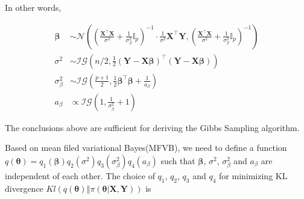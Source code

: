 \documentclass[12pt]{article}
\begin{document}
In other words,

\begin{align*}
	\bm{\beta} &\sim \mathcal{N}\left(\left(\frac{\bm{X}^\top \bm{X}}{\sigma^2} + \frac{1}{\sigma_{\beta}^2} \mathbb{I}_{p} \right)^{-1} \cdot \frac{1}{\sigma^2}\bm{X}^\top \bm{Y},  \left(\frac{\bm{X}^\top \bm{X}}{\sigma^2} + \frac{1}{\sigma_{\beta}^2} \mathbb{I}_{p} \right)^{-1} \right)\\
	\sigma^2 & \sim \mathcal{IG}\left(n/2, \frac{1}{2} (\bm{Y} - \bm{X}\bm{\beta})^\top (\bm{Y} - \bm{X}\bm{\beta}) \right) \\
	\sigma_{\beta}^2 & \sim \mathcal{IG}\left( \frac{p+1}{2}, \frac{1}{2}\bm{\beta}^\top \bm{\beta} + \frac{1}{a_\beta} \right)\\
	a_\beta &\propto \mathcal{IG}\left(1, \frac{1}{\sigma_{\beta}^2} + 1  \right)
\end{align*}


The conclusions above are sufficient for deriving the Gibbs Sampling algorithm.

Based on mean filed variational Bayes(MFVB), we need to define a function $q(\bm{\theta}) = q_1(\bm{\beta})q_2(\sigma^2)q_3(\sigma_{\beta}^2)q_4(a_\beta)$ such that $\bm{\beta}$, $\sigma^2$, $\sigma_{\beta}^2$ and $a_\beta$ are independent of each other. The choice of $q_1$, $q_2$, $q_3$ and $q_4$ for minimizing KL divergence $Kl\left(\left. q(\bm{\theta}) \right\Vert \pi(\left.\bm{\theta}\right\vert \bm{X}, \bm{Y})\right)$ is
\end{document}
